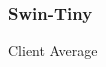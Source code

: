 \documentclass[letterpaper]{article}
\begin{document}
\subsubsection{Swin-Tiny}

Client Average


\end{document}
